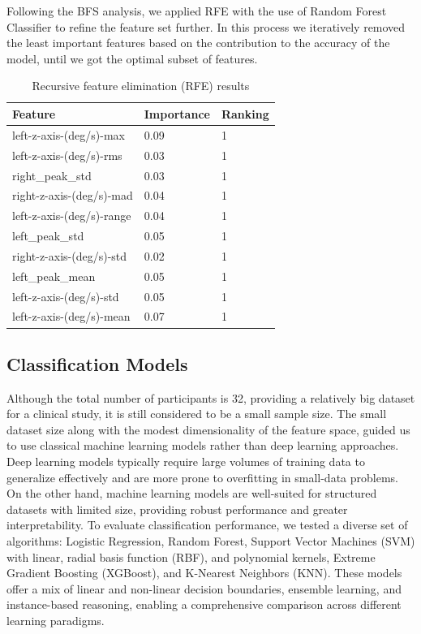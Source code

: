 Following the BFS analysis, we applied RFE with the use of Random Forest Classifier to refine the feature set further. In this process we 
iteratively removed the least important features based on the contribution to the accuracy of the model, until we got the optimal subset of features.
\begin{table}[H]
    \centering
    \caption{Recursive feature elimination (RFE) results}
    \small
    \begin{tabularx}{\columnwidth}{l l X}
        \hline
        \textbf{Feature} & \textbf{Importance} & \textbf{Ranking} \\
        \hline
        left-z-axis-(deg/s)-max   & 0.09 & 1 \\
        left-z-axis-(deg/s)-rms   & 0.03 & 1 \\
        right\_peak\_std          & 0.03 & 1 \\
        right-z-axis-(deg/s)-mad  & 0.04 & 1 \\
        left-z-axis-(deg/s)-range & 0.04 & 1 \\
        left\_peak\_std           & 0.05 & 1 \\
        right-z-axis-(deg/s)-std  & 0.02 & 1 \\
        left\_peak\_mean          & 0.05 & 1 \\
        left-z-axis-(deg/s)-std   & 0.05 & 1 \\
        left-z-axis-(deg/s)-mean  & 0.07 & 1 \\
        \hline
    \end{tabularx}
    \label{tab:rfe}
\end{table}



\subsection{Classification Models}
Although the total number of participants is 32, providing a relatively big dataset for a clinical study, it is still considered to be a small sample size. The small 
dataset size along with the modest dimensionality of the feature space, guided us to use classical machine learning models rather than deep learning 
approaches. Deep learning models typically require large volumes of training data to generalize effectively and are more prone to overfitting in small-data problems. 
On the other hand, machine learning models are well-suited for structured datasets with limited size, providing robust performance and greater interpretability. 
To evaluate classification performance, we tested a diverse set of algorithms: Logistic Regression, Random Forest, Support Vector Machines (SVM) with linear, radial 
basis function (RBF), and polynomial kernels, Extreme Gradient Boosting (XGBoost), and K-Nearest Neighbors (KNN). These models offer a mix of linear and non-linear 
decision boundaries, ensemble learning, and instance-based reasoning, enabling a comprehensive comparison across different learning paradigms.


